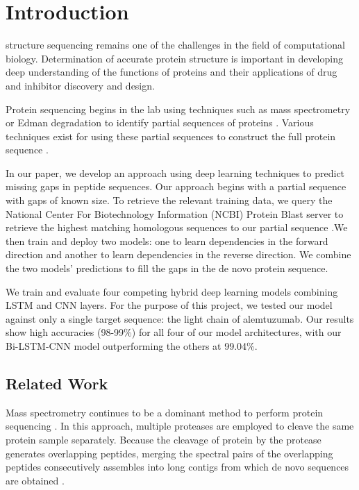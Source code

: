 \documentclass[journal]{IEEEtran}
\begin{document}
%
\IEEEpeerreviewmaketitle

\section{Introduction}
   structure sequencing remains one of the challenges in the field of computational biology.
    Determination of accurate protein structure is important in developing deep understanding of the
    functions of proteins and their applications of drug and inhibitor discovery and design.

    Protein sequencing begins in the lab using techniques such as mass spectrometry or Edman degradation
    to identify partial sequences of proteins \cite{mann2016rise, edman1949method}. Various techniques exist for using these
    partial sequences to construct the full protein sequence
    \cite{standing2003peptide,perkins1999probability, eng1994approach, yang2021full}.

    In our paper, we develop an approach using deep learning techniques to predict missing gaps in peptide sequences.
    Our approach begins with a partial sequence with gaps of known size. To retrieve the relevant training data,
    we query the National Center For Biotechnology Information (NCBI) Protein Blast server to retrieve the highest matching
    homologous sequences to our partial sequence \cite{ncbi}.We then train and deploy two models: one to learn dependencies
    in the forward direction and another to learn dependencies in the reverse direction. We combine the two 
    models' predictions to fill the gaps in the de novo protein sequence.

    We train and evaluate four competing hybrid deep learning models combining LSTM and CNN layers.     
    For the purpose of this project, we tested our model against only a single 
    target sequence: the light chain of alemtuzumab. Our results show high accuracies (98-99\%) for all four of our model architectures,
    with our Bi-LSTM-CNN model outperforming the others at 99.04\%.

    \subsection{Related Work}

    Mass spectrometry continues to be a dominant method to perform protein sequencing \cite{mann2016rise}.
    In this approach, multiple proteases are employed to cleave the same protein sample separately.
    Because the cleavage of protein by the protease generates overlapping peptides, merging the spectral
    pairs of the overlapping peptides consecutively assembles into long contigs from which de novo
    sequences are obtained \cite{liu2014novo}.
\end{document}
